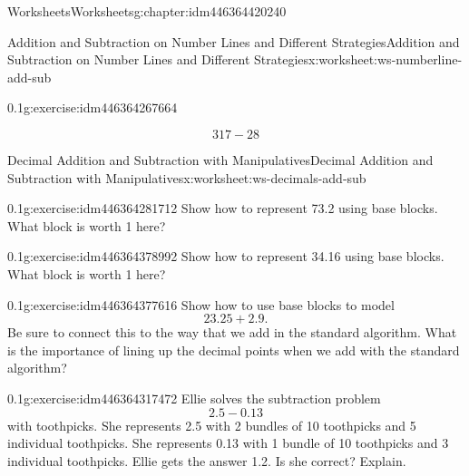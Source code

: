 \documentclass[twoside,11pt,]{book}
\begin{document}
\begin{chapterptx}{Worksheets}{}{Worksheets}{}{}{g:chapter:idm446364420240}
\begin{worksheet-section-numberless}{Addition and Subtraction on Number Lines and Different Strategies}{}{Addition and Subtraction on Number Lines and Different Strategies}{}{}{x:worksheet:ws-numberline-add-sub}
\begin{divisionexercise}{3}{}{0.1}{g:exercise:idm446364267664}
\begin{enumerate}[label=(\alph*)]
\begin{equation*}
317-28
\end{equation*}
%
\end{enumerate}
\end{divisionexercise}%
\end{worksheet-section-numberless}
\restoregeometry
%
%
\typeout{************************************************}
\typeout{************************************************}
%
\begin{worksheet-section-numberless}{Decimal Addition and Subtraction with Manipulatives}{}{Decimal Addition and Subtraction with Manipulatives}{}{}{x:worksheet:ws-decimals-add-sub}
\begin{divisionexercise}{1}{}{0.1}{g:exercise:idm446364281712}%
Show how to represent 73.2 using base blocks.  What block is worth 1 here?%
\end{divisionexercise}%
\begin{divisionexercise}{2}{}{0.1}{g:exercise:idm446364378992}%
Show how to represent 34.16 using base blocks.  What block is worth 1 here?%
\end{divisionexercise}%
\begin{divisionexercise}{3}{}{0.1}{g:exercise:idm446364377616}%
Show how to use base blocks to model%
\begin{equation*}
23.25+2.9\text{.}
\end{equation*}
Be sure to connect this to the way that we add in the standard algorithm.  What is the importance of lining up the decimal points when we add with the standard algorithm?%
\end{divisionexercise}%
\begin{divisionexercise}{4}{}{0.1}{g:exercise:idm446364317472}%
Ellie solves the subtraction problem%
\begin{equation*}
2.5-0.13
\end{equation*}
with toothpicks.  She represents 2.5 with 2 bundles of 10 toothpicks and 5 individual toothpicks.  She represents 0.13 with 1 bundle of 10 toothpicks and 3 individual toothpicks.  Ellie gets the answer 1.2.  Is she correct?  Explain.%
\end{divisionexercise}%
\end{worksheet-section-numberless}
\restoregeometry
%
%
\typeout{************************************************}
\typeout{************************************************}

\end{chapterptx}
\end{document}
